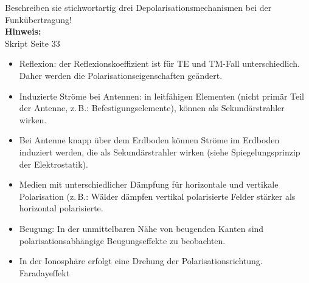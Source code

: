 \begin{question}[section=3,name={Depolarisation},difficulty=,quantity=5,type=thr,tags={20160310,20130314}]
	Beschreiben sie stichwortartig drei Depolarisationsmechanismen bei der Funkübertragung!
	\\ \textbf{Hinweis:}\\
	Skript Seite 33
\end{question}
\begin{solution}
	\begin{itemize}
		\item{Reflexion: der Reflexionskoeffizient ist für TE und TM-Fall unterschiedlich. Daher werden die Polarisationseigenschaften geändert.}
		\item{Induzierte Ströme bei Antennen: in leitfähigen Elementen (nicht primär Teil der Antenne, z.\,B.: Befestigungselemente), können als Sekundärstrahler wirken.}
		\item{Bei Antenne knapp über dem Erdboden können Ströme im Erdboden induziert werden, die als Sekundärstrahler wirken (siehe Spiegelungsprinzip der Elektrostatik).}
		\item{Medien mit unterschiedlicher Dämpfung für horizontale und vertikale Polarisation (z.\,B.: Wälder dämpfen vertikal polarisierte Felder stärker als horizontal polarisierte.}
		\item{Beugung: In der unmittelbaren Nähe von beugenden Kanten sind polarisationsabhängige Beugungseffekte zu beobachten.}
		\item{In der Ionosphäre erfolgt eine Drehung der Polarisationsrichtung. Faradayeffekt}
	\end{itemize}
\end{solution}